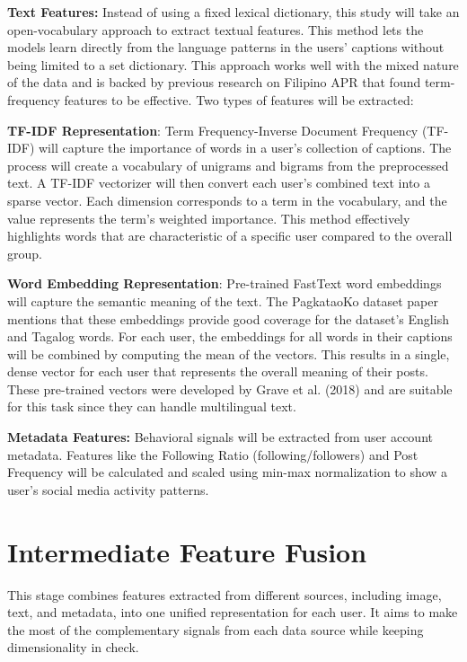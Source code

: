 \textbf{Text Features:}
Instead of using a fixed lexical dictionary, this study will take an open-vocabulary approach to extract textual features. This method lets the models learn directly from the language patterns in the users' captions without being limited to a set dictionary. This approach works well with the mixed nature of the data and is backed by previous research on Filipino APR that found term-frequency features to be effective. Two types of features will be extracted: 

\textbf{TF-IDF Representation}: Term Frequency-Inverse Document Frequency (TF-IDF) will capture the importance of words in a user's collection of captions. The process will create a vocabulary of unigrams and bigrams from the preprocessed text. A TF-IDF vectorizer will then convert each user's combined text into a sparse vector. Each dimension corresponds to a term in the vocabulary, and the value represents the term's weighted importance. This method effectively highlights words that are characteristic of a specific user compared to the overall group.

\textbf{Word Embedding Representation}: Pre-trained FastText word embeddings will capture the semantic meaning of the text. The PagkataoKo dataset paper mentions that these embeddings provide good coverage for the dataset's English and Tagalog words. For each user, the embeddings for all words in their captions will be combined by computing the mean of the vectors. This results in a single, dense vector for each user that represents the overall meaning of their posts. These pre-trained vectors were developed by Grave et al. (2018) and are suitable for this task since they can handle multilingual text.


\textbf{Metadata Features: }
Behavioral signals will be extracted from user account metadata. Features like the Following Ratio (following/followers) and Post Frequency will be calculated and scaled using min-max normalization to show a user's social media activity patterns.

\section{Intermediate Feature Fusion}
\label{subsec:fusion}
This stage combines features extracted from different sources, including image, text, and metadata, into one unified representation for each user. It aims to make the most of the complementary signals from each data source while keeping dimensionality in check. 

